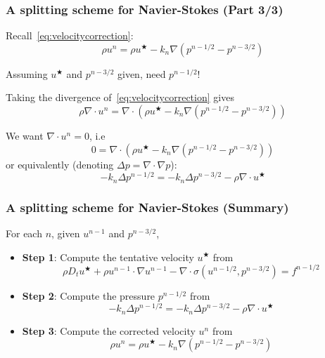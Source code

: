\begin{frame}
  \frametitle{A splitting scheme for Navier-Stokes (Part 3/3)}

  \vspace{1em}
  Recall~\eqref{eq:velocitycorrection}:
  \begin{equation*}
    \rho u^n = \rho u^{\bigstar} - k_n \nabla (p^{n-1/2} - p^{n-3/2})
  \end{equation*}

  Assuming $u^{\bigstar}$ and $p^{n - 3/2}$ given, \alert{need $p^{n-1/2}$!}

  \bigskip

  Taking the divergence of~\eqref{eq:velocitycorrection} gives
  \begin{equation*}
    \rho \nabla \cdot u^n  = \nabla \cdot \left ( \rho u^{\bigstar} - k_n \nabla (p^{n-1/2} - p^{n-3/2}) \right )
  \end{equation*}

  We want $\nabla \cdot u^n = 0$, i.e
  \begin{equation*}
    0  = \nabla \cdot \left ( \rho u^{\bigstar} - k_n \nabla (p^{n-1/2} - p^{n-3/2}) \right )
  \end{equation*}
  or equivalently (denoting $\Delta p = \nabla \cdot \nabla p$):
  \begin{equation}
    - k_n \Delta p^{n-1/2} = -k_n \Delta p^{n-3/2} - \rho \nabla \cdot u^{\bigstar}
    \label{eq:pressurecorrection}
  \end{equation}
\end{frame}


\begin{frame}
\frametitle{A splitting scheme for Navier-Stokes (Summary)}

For each $n$, given $u^{n-1}$ and $p^{n-3/2}$,
\medskip
\begin{itemize}
\item
  \textbf{Step 1}: Compute the tentative velocity $u^{\bigstar}$ from
  \begin{equation*}
    \rho D_t u^{\bigstar} + \rho u^{n-1} \cdot \nabla u^{n-1}
    - \nabla \cdot \sigma(u^{n-1/2}, p^{n-3/2})
    = f^{n-1/2}
  \end{equation*}
  \item
    \textbf{Step 2}: Compute the pressure $p^{n - 1/2}$ from
    \begin{equation*}
      - k_n \Delta p^{n-1/2} = -k_n \Delta p^{n-3/2} - \rho \nabla \cdot u^{\bigstar}
    \end{equation*}
  \item
  \textbf{Step 3}: Compute the corrected velocity $u^{n}$ from
  \begin{equation*}
    \rho u^n = \rho u^{\bigstar} - k_n \nabla (p^{n-1/2} - p^{n-3/2})
  \end{equation*}
\end{itemize}
\end{frame}
